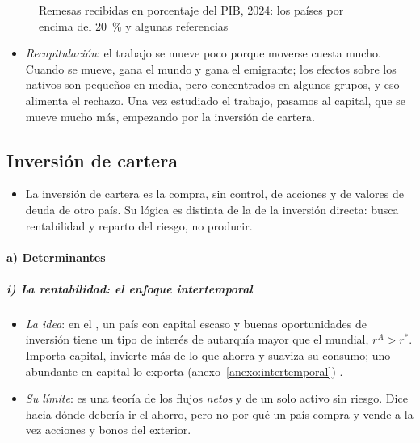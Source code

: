 \documentclass[11pt]{article}
\begin{document}
\begin{figure}[H]
\centering
\caption{Remesas recibidas en porcentaje del PIB, 2024: los países por encima del 20~\% y algunas referencias}\label{fig:remesas-pib}
\end{figure}

\begin{itemize}
\item \emph{Recapitulación}: el trabajo se mueve poco porque moverse cuesta mucho. Cuando se mueve, gana el mundo y gana el emigrante; los efectos sobre los nativos son pequeños en media, pero concentrados en algunos grupos, y eso alimenta el rechazo. Una vez estudiado el trabajo, pasamos al capital, que se mueve mucho más, empezando por la inversión de cartera.
\end{itemize}

\subsection{Inversión de cartera}\label{sec:cartera}

\begin{itemize}
\item La inversión de cartera es la compra, sin control, de acciones y de valores de deuda de otro país. Su lógica es distinta de la de la inversión directa: busca rentabilidad y reparto del riesgo, no producir.
\end{itemize}

\paragraph{a) Determinantes}

\subparagraph{i) La rentabilidad: el enfoque intertemporal}

\begin{itemize}
\item \emph{La idea}: en el , un país con capital escaso y buenas oportunidades de inversión tiene un tipo de interés de autarquía mayor que el mundial, $r^A>r^*$. Importa capital, invierte más de lo que ahorra y suaviza su consumo; uno abundante en capital lo exporta (anexo~\ref{anexo:intertemporal})\nocite{ObstfeldRogoff1995Intertemporal} .
\item \emph{Su límite}: es una teoría de los flujos \emph{netos} y de un solo activo sin riesgo. Dice hacia dónde debería ir el ahorro, pero no por qué un país compra y vende a la vez acciones y bonos del exterior.
\end{itemize}
\end{document}
